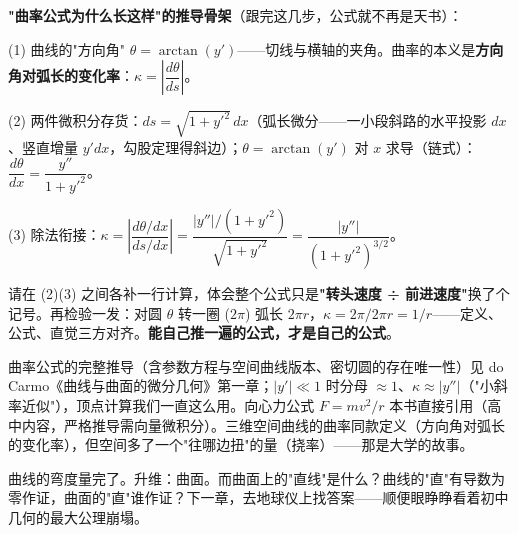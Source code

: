 \begin{shaonao}
\textbf{"曲率公式为什么长这样"的推导骨架}（跟完这几步，公式就不再是天书）：

(1) 曲线的"方向角" $\theta = \arctan(y')$——切线与横轴的夹角。曲率的本义是\textbf{方向角对弧长的变化率}：$\kappa = \left|\dfrac{d\theta}{ds}\right|$。

(2) 两件微积分存货：$ds = \sqrt{1 + y'^2}\,dx$（弧长微分——一小段斜路的水平投影 $dx$、竖直增量 $y'dx$，勾股定理得斜边）；$\theta = \arctan(y')$ 对 $x$ 求导（链式）：$\dfrac{d\theta}{dx} = \dfrac{y''}{1+y'^2}$。

(3) 除法衔接：$\kappa = \left|\dfrac{d\theta/dx}{ds/dx}\right| = \dfrac{|y''|/(1+y'^2)}{\sqrt{1+y'^2}} = \dfrac{|y''|}{(1+y'^2)^{3/2}}$。

请在 (2)(3) 之间各补一行计算，体会整个公式只是\textbf{"转头速度 ÷ 前进速度"}换了个记号。再检验一发：对圆 $\theta$ 转一圈 ($2\pi$) 弧长 $2\pi r$，$\kappa = 2\pi/2\pi r = 1/r$——定义、公式、直觉三方对齐。\textbf{能自己推一遍的公式，才是自己的公式}。
\end{shaonao}

\begin{chengshi}
曲率公式的完整推导（含参数方程与空间曲线版本、密切圆的存在唯一性）见 do Carmo《曲线与曲面的微分几何》第一章；$|y'| \ll 1$ 时分母 $\approx 1$、$\kappa \approx |y''|$（"小斜率近似"），顶点计算我们一直这么用。向心力公式 $F = mv^2/r$ 本书直接引用（高中内容，严格推导需向量微积分）。三维空间曲线的曲率同款定义（方向角对弧长的变化率），但空间多了一个"往哪边扭"的量（挠率）——那是大学的故事。
\end{chengshi}

曲线的弯度量完了。升维：曲面。而曲面上的"直线"是什么？曲线的"直"有导数为零作证，曲面的"直"谁作证？下一章，去地球仪上找答案——顺便眼睁睁看着初中几何的最大公理崩塌。
